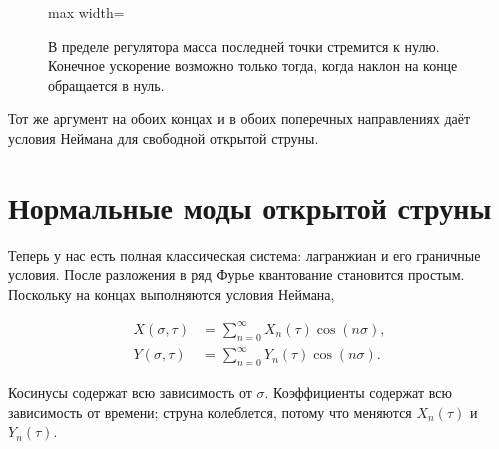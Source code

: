 \begin{figure}[H]
  \centering
  \begin{adjustbox}{max width=\linewidth}
  \end{adjustbox}
  \caption{В пределе регулятора масса последней точки стремится к нулю. Конечное
  ускорение возможно только тогда, когда наклон на конце обращается в нуль.}
  \label{fig:l02-neumann-redraw}
\end{figure}

Тот же аргумент на обоих концах и в обоих поперечных направлениях даёт
условия Неймана для свободной открытой струны.

\section{Нормальные моды открытой струны}

Теперь у нас есть полная классическая система: лагранжиан и его граничные
условия. После разложения в ряд Фурье квантование становится простым. Поскольку
на концах выполняются условия Неймана,

\begin{align}
  X(\sigma,\tau)
  &=
  \sum_{n=0}^{\infty}X_n(\tau)\cos(n\sigma),
  \label{eq:l02-X-expansion}\\
  Y(\sigma,\tau)
  &=
  \sum_{n=0}^{\infty}Y_n(\tau)\cos(n\sigma).
  \label{eq:l02-Y-expansion}
\end{align}

Косинусы содержат всю зависимость от \(\sigma\). Коэффициенты содержат всю
зависимость от времени; струна колеблется, потому что меняются \(X_n(\tau)\) и \(Y_n(\tau)\).

